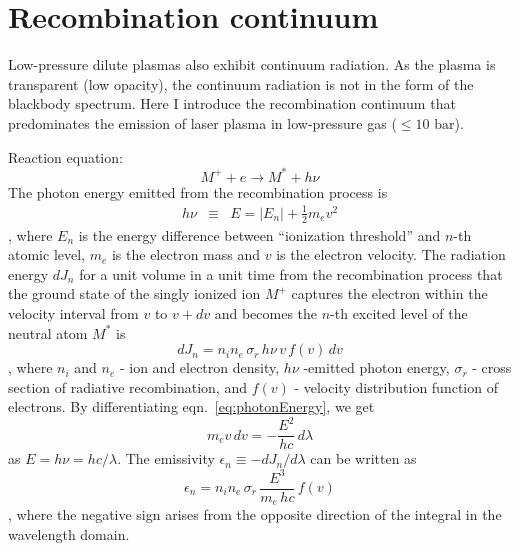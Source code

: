 
\chapter{Recombination continuum}
\label{sec:ap6}

Low-pressure dilute plasmas also exhibit continuum radiation. As the plasma is transparent (low opacity), the continuum radiation is not in the form of the blackbody spectrum. Here I introduce the recombination continuum that predominates the emission of laser plasma in low-pressure gas ($\le 10 \text{ bar}$).

Reaction equation:
\begin{equation}
M^{+}+e\rightarrow M^{*}+h\nu
\end{equation}
The photon energy emitted from the recombination process is 
\begin{eqnarray}
h\nu & \equiv & E=\left|E_{n}\right|+\frac{1}{2}m_{e}v^{2}
\label{eq:photonEnergy}
\end{eqnarray}
, where $E_{n}$ is the energy difference between ``ionization threshold'' and $n$-th atomic level, $m_{e}$ is the electron mass and $v$ is the electron velocity. The radiation energy $dJ_{n}$ for a unit volume in a unit time from the recombination process that the ground state of the singly ionized ion $M^{+}$ captures the electron within the velocity interval from $v$ to $v+dv$ and becomes the $n$-th excited level of the neutral atom $M^{*}$ is
\begin{equation}
dJ_{n}=n_{i}n_{e}\,\sigma_{r}\,h\nu\,v\,f(v)\,dv
\end{equation}
, where $n_{i}$ and $n_{e}$ - ion and electron density, $h\nu$ -emitted photon energy, $\sigma_{r}$ - cross section of radiative recombination, and $f(v)$ - velocity distribution function of electrons. By differentiating eqn.~\ref{eq:photonEnergy}, we get
\begin{equation}
m_{e}v\,dv=-\frac{E^{2}}{hc}\,d\lambda
\end{equation}
 as $E=h\nu=hc/\lambda$. The emissivity $\epsilon_{n}\equiv-dJ_{n}/d\lambda$ can be written as
\begin{equation}
\epsilon_{n}=n_{i}n_{e}\,\sigma_{r}\,\frac{E^{3}}{m_{e}\,hc}\,f(v)
\end{equation}
, where the negative sign arises from the opposite direction of the integral in the wavelength domain.

